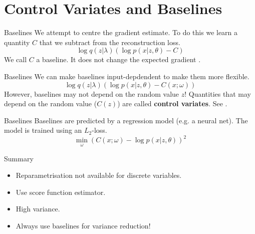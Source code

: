 \documentclass[14pt]{beamer}
\begin{document}
\section{Control Variates and Baselines}

\begin{frame}
\tableofcontents[currentsection]
\end{frame}

\begin{frame}{Baselines}
We attempt to centre the gradient estimate. To do this we learn a quantity $ C $ that we subtract
from the reconstruction loss.
\begin{equation*}
\log q(z|\lambda) \left( \log p(x|z,\theta) - C \right)
\end{equation*}
We call $ C $ a baseline. It does not change the expected gradient \citep{Williams:1992}.
\end{frame}

\begin{frame}{Baselines}
We can make baselines input-depdendent to make them more flexible.
\begin{equation*}
\log q(z|\lambda) \left( \log p(x|z,\theta) - C(x; \omega) \right)
\end{equation*}
However, baselines may not depend on the random value $ z $! Quantities that may depend on the
random value ($ C(z) $) are called \textbf{control variates}. See \cite{PaisleyEtAl:2012, RanganathEtAl:2014,GregorEtAl:2014}.
\end{frame}

\begin{frame}{Baselines}
Baselines are predicted by a regression model (e.g. a neural net). The model is trained using 
an $ L_{2} $-loss.
\begin{equation*}
\min_\omega \left(C(x; \omega) - \log p(x|z,\theta)\right)^{2}
\end{equation*}
\end{frame}

\begin{frame}{Summary}
\begin{itemize}
\pause
\item Reparametrisation not available for discrete variables.
\pause
\item Use score function estimator.
\pause
\item High variance.
\pause
\item Always use baselines for variance reduction!
\end{itemize}
\end{frame}
\end{document}
